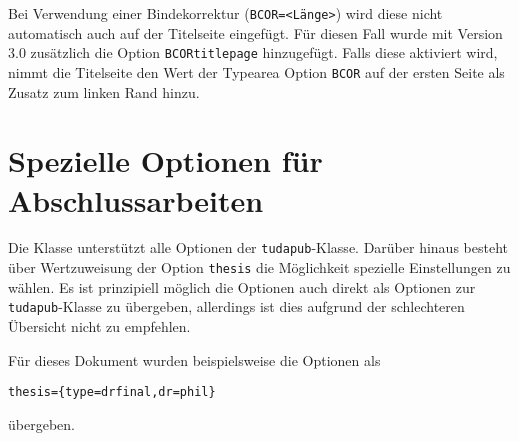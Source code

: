 \documentclass[
	ngerman,
	ruledheaders=section,%
	class=report,%
	thesis={type=bachelor},%
	accentcolor=9c,%
	custommargins=true,%
	marginpar=false,%
	parskip=half-,%
	fontsize=11pt,%
]{tudapub}
\let\file\texttt
\let\code\texttt
\begin{document}
Bei Verwendung einer Bindekorrektur (\code{BCOR=<Länge>}) wird diese nicht automatisch auch auf der Titelseite eingefügt. Für diesen Fall wurde mit Version 3.0 zusätzlich die Option \code{BCORtitlepage} hinzugefügt. Falls diese aktiviert wird, nimmt die Titelseite den Wert der Typearea Option \code{BCOR} auf der ersten Seite als Zusatz zum linken Rand hinzu.



\section{Spezielle Optionen für Abschlussarbeiten}
Die Klasse unterstützt alle Optionen der \file{tudapub}-Klasse. Darüber hinaus besteht über Wertzuweisung der Option \code{thesis} die Möglichkeit spezielle Einstellungen zu wählen.
Es ist prinzipiell möglich die Optionen auch direkt als Optionen zur \file{tudapub}-Klasse zu übergeben, allerdings ist dies aufgrund der schlechteren Übersicht nicht zu empfehlen.

Für dieses Dokument wurden beispielsweise die Optionen als
\begin{verbatim}
thesis={type=drfinal,dr=phil}
\end{verbatim}
übergeben.
\end{document}
